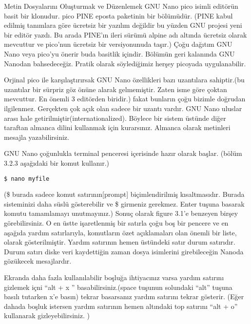 \documentclass[10pt,a5paper]{book}
\begin{document}
\begin{section}{Metin Dosyalarını Oluşturmak ve Düzenlemek}
GNU Nano pico isimli editörün basit bir klonudur. pico PINE eposta paketinin bir bölümüdür. (PINE kabul edilmiş tanımlara göre ücretsiz bir yazılım değildir bu yüzden GNU projesi yeni bir editör yazdı. Bu arada PINE’ın ileri sürümü alpine adı altında ücretsiz olarak mevcuttur ve pico’nun ücretsiz bir versiyonunuda taşır.) Çoğu dağıtım GNU Nano veya pico’yu önerir buda basitlik içindir. Bölümün geri kalanında GNU Nanodan bahsedeceğiz. Pratik olarak söylediğimiz herşey picoyada uygulanabilir.

Orjinal pico ile karşılaştırırsak GNU Nano özellikleri bazı uzantılara sahiptir.(bu uzantılar bir sürpriz göz önüne alarak gelmemiştir. Zaten isme göre çoktan mevcuttur. En önemli 3 editörden biridir.) fakat bunların çoğu bizimle doğrudan ilgilenmez. Gerçekten çok açık olan sadece bir uzantı vardır. GNU Nano uluslar arası hale getirilmiştir(internationalized). Böylece bir sistem üstünde diğer taraftan almanca dilini kullanmak için kurarsınız.  Almanca olarak metinleri mesajla yazabilirsiniz.

GNU Nano çoğunlukla terminal penceresi içerisinde hazır olarak başlar. (bölüm 3.2.3 aşağıdaki bir komut kullanır.)

\begin{verbatim}
$ nano myfile
\end{verbatim}

(\$ burada sadece komut satırının[prompt] biçimlendirilmiş kısaltmasıdır. Burada sisteminizi daha süslü gösterebilir ve \$ girmeniz gerekmez. Enter tuşuna basarak komutu tamamlamayı unutmayınız.) Sonuç olarak figure 3.1’e benzeyen birşey görebilirsiniz. O en üstte işaretlenmiş bir satırla çoğu boş bir pencere ve en aşağıda yardım satırlarıyla, komutların özet açıklamaları olan önemli bir liste, olarak gösterilmiştir. Yardım satırının hemen üstündeki satır durum satırıdır. Durum satırı diske veri kaydettiğin zaman dosya isimlerini girebileceğin Nanoda gözükecek mesajlardır. 

Ekranda daha fazla kullanılabilir boşluğa ihtiyacınız varsa yardım satırını gizlemek içni “alt + x ” basabilirsiniz.(space tuşunun solundaki “alt” tuşuna basılı tutarken x’e basın) tekrar basarsanız yardım satırını tekrar gösterir. (Eğer dahada boşluk istersen yardım satırının hemen altındaki top satırını “alt + o” kullanarak gizleyebilirsiniz. )


\end{section}
\end{document}
